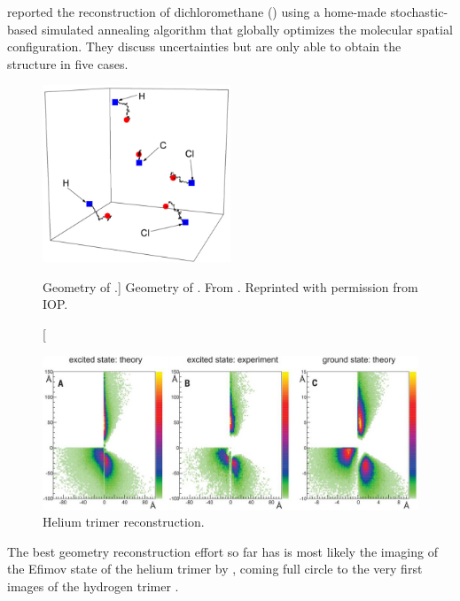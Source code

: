\citet{Gagnon08} reported the reconstruction of dichloromethane () using a home-made \footnotemark stochastic-based simulated annealing algorithm that globally optimizes the molecular spatial configuration. They discuss uncertainties but are only able to obtain the structure in five cases.


\begin{figure}
  \centering
  \includegraphics[width=0.5\textwidth]{gfx/CH2Cl2Geometry}
  \caption
  [Geometry of .]
  {Geometry of . From \citet{Gagnon08}. Reprinted with permission from IOP.}
  \label{fig:CH2Cl2geometry}
\end{figure}

\pagebreak
\begin{figure}
  \centering
  \includegraphics[width=\textwidth]{gfx/HeliumTrimerReconstruction}
  \caption[Helium trimer reconstruction.]
  {Helium trimer reconstruction.}
  \label{fig:heliumTrimerReconstruction}
\end{figure}
\clearpage


The best geometry reconstruction effort so far has is most likely the imaging of the Efimov state of the helium trimer by \citet{Kunitski15}, coming full circle to the very first images of the hydrogen trimer \citep{Gaillard78}.

